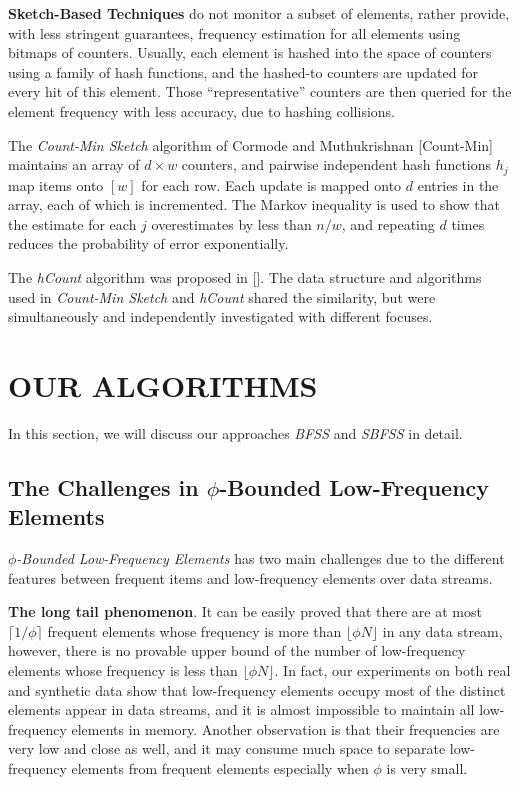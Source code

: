 \documentclass[conference]{IEEEtran}
\begin{document}
\textbf{Sketch-Based Techniques} do not monitor a subset of elements, rather provide, with less stringent guarantees, frequency estimation for all elements using bitmaps of counters. Usually, each element is hashed into the space of counters using a family of hash functions, and the hashed-to counters are updated for every hit of this element. Those “representative” counters are then queried for the element frequency with less accuracy, due to hashing collisions.\par

The \emph{Count-Min Sketch} algorithm of Cormode and Muthukrishnan [Count-Min] maintains an array of $d\times w$ counters, and pairwise independent hash functions $h_j$ map items onto $[w]$ for each row. Each update is mapped onto $d$ entries in the array, each of which is incremented. The Markov inequality is used to show that the estimate for each $j$ overestimates by less than $n/w$, and repeating $d$ times reduces the probability of error exponentially.\par

The \emph{hCount} algorithm was proposed in []. The data structure and algorithms used in \emph{Count-Min Sketch} and \emph{hCount} shared the similarity, but were simultaneously and independently investigated with different focuses.

\section{OUR ALGORITHMS}
In this section, we will discuss our approaches \emph{BFSS} and \emph{SBFSS} in detail.
\subsection{The Challenges in $\phi$-Bounded Low-Frequency Elements}
$\phi$\emph{-Bounded Low-Frequency Elements} has two main challenges due to the different features between frequent items and low-frequency elements over data streams.\par

\textbf{The long tail phenomenon}. It can be easily proved that there are at most $\lceil1/\phi\rceil$ frequent elements whose frequency is more than $\lfloor\phi N\rfloor$ in any data stream, however, there is no provable upper bound of the number of low-frequency elements whose frequency is less than $\lfloor\phi N\rfloor$. In fact, our experiments on both real and synthetic data show that low-frequency elements occupy most of the distinct elements appear in data streams, and it is almost impossible to maintain all low-frequency elements in memory. Another observation is that their frequencies are very low and close as well, and it may consume much space to separate low-frequency elements from frequent elements especially when $\phi$ is very small.\par
\end{document}
